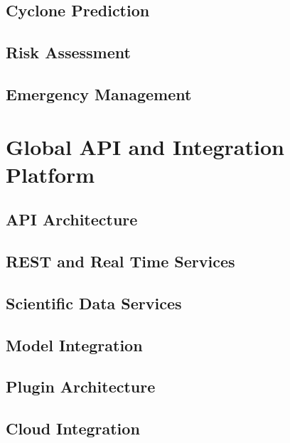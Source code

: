 \documentclass[11pt,a4paper,oneside]{report}
\begin{document}
\chapter{Cyclone Prediction}



\chapter{Risk Assessment}



\chapter{Emergency Management}



\part{Global API and Integration Platform}


\chapter{API Architecture}



\chapter{REST and Real Time Services}



\chapter{Scientific Data Services}



\chapter{Model Integration}



\chapter{Plugin Architecture}



\chapter{Cloud Integration}

\end{document}
